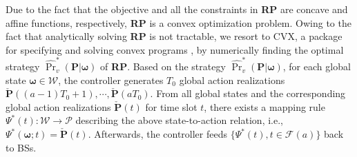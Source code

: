 \documentclass[conference]{IEEEtran}
\begin{document}
Due to the fact that the objective and all the constraints in {\bf RP} are concave and affine functions, respectively, {\bf RP} is a convex optimization problem.
Owing to the fact that  analytically solving {\bf RP}
  is not tractable, we resort to CVX, a package for specifying and solving convex programs \cite{cvx}, by numerically finding the optimal strategy  $\hat{\Pr}^{*}_v(\mathbf{P}|\boldsymbol{\omega})$ of {\bf RP}.
%
%
%
Based on the strategy $\hat{\Pr}^{*}_v(\mathbf{P}|\boldsymbol{\omega})$,  for each global state $\boldsymbol{\omega}\in\mathcal{W}$, the controller generates $T_0$ global action realizations  $\check{\mathbf{P}}((a-1)T_0+1),\cdots,\check{\mathbf{P}}(aT_0)$. From all global states and the corresponding global action realizations $\check{\mathbf{P}}(t)$ for time slot $t$, there exists a mapping rule $\Psi^{*}(t):\mathcal{W}\to\mathcal{P}$ describing the above state-to-action relation, i.e., $\Psi^{*}(\boldsymbol{\omega};t)=\check{\mathbf{P}}(t)$.
Afterwards, the controller feeds $\{\Psi^{*}(t),t\in\mathcal{F}(a)\}$ back to BSs.
\end{document}
